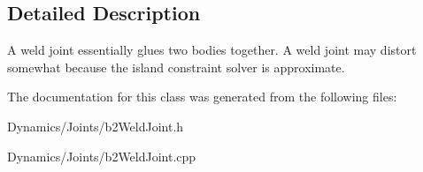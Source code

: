 \subsection{Detailed Description}
A weld joint essentially glues two bodies together. A weld joint may distort somewhat because the island constraint solver is approximate. 

The documentation for this class was generated from the following files\+:\begin{DoxyCompactItemize}
\item 
Dynamics/\+Joints/b2\+Weld\+Joint.\+h\item 
Dynamics/\+Joints/b2\+Weld\+Joint.\+cpp\end{DoxyCompactItemize}
